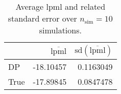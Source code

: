 \begin{table}[H]

\caption{Average lpml and related standard error over $n_{\text{sim}} = 10$ simulations.}
\centering
\begin{tabular}[t]{lrr}
\toprule
  & $\overbar{\text{lpml}}$ & $\text{sd}(\overbar{\text{lpml}})$\\
\midrule
DP & -18.10457 & 0.1163049\\
True & -17.89845 & 0.0847478\\
\bottomrule
\end{tabular}
\end{table}